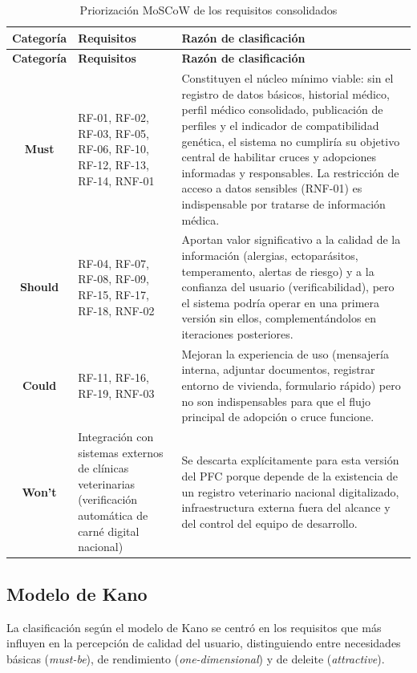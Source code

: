\begin{longtable}{|c|p{2.5cm}|p{10.5cm}|}
	\caption{Priorización MoSCoW de los requisitos consolidados}
	\label{tab:moscow} \\
	\hline
	\textbf{Categoría} & \textbf{Requisitos} & \textbf{Razón de clasificación} \\ \hline
	\endfirsthead
	\hline
	\textbf{Categoría} & \textbf{Requisitos} & \textbf{Razón de clasificación} \\ \hline
	\endhead
	\textbf{Must} & RF-01, RF-02, RF-03, RF-05, RF-06, RF-10, RF-12, RF-13, RF-14, RNF-01 & Constituyen el núcleo mínimo viable: sin el registro de datos básicos, historial médico, perfil médico consolidado, publicación de perfiles y el indicador de compatibilidad genética, el sistema no cumpliría su objetivo central de habilitar cruces y adopciones informadas y responsables. La restricción de acceso a datos sensibles (RNF-01) es indispensable por tratarse de información médica. \\ \hline
	\textbf{Should} & RF-04, RF-07, RF-08, RF-09, RF-15, RF-17, RF-18, RNF-02 & Aportan valor significativo a la calidad de la información (alergias, ectoparásitos, temperamento, alertas de riesgo) y a la confianza del usuario (verificabilidad), pero el sistema podría operar en una primera versión sin ellos, complementándolos en iteraciones posteriores. \\ \hline
	\textbf{Could} & RF-11, RF-16, RF-19, RNF-03 & Mejoran la experiencia de uso (mensajería interna, adjuntar documentos, registrar entorno de vivienda, formulario rápido) pero no son indispensables para que el flujo principal de adopción o cruce funcione. \\ \hline
	\textbf{Won't} & Integración con sistemas externos de clínicas veterinarias (verificación automática de carné digital nacional) & Se descarta explícitamente para esta versión del PFC porque depende de la existencia de un registro veterinario nacional digitalizado, infraestructura externa fuera del alcance y del control del equipo de desarrollo. \\ \hline
\end{longtable}

\subsection{Modelo de Kano}

La clasificación según el modelo de Kano \cite{moscow_kano} se centró en los requisitos que más influyen en la percepción de calidad del usuario, distinguiendo entre necesidades básicas (\textit{must-be}), de rendimiento (\textit{one-dimensional}) y de deleite (\textit{attractive}).

